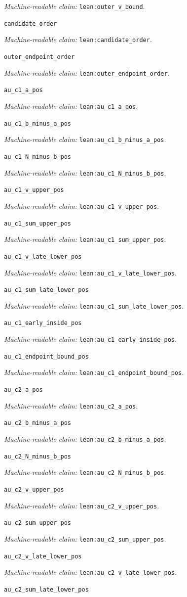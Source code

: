 \documentclass[11pt]{amsart}
\newcommand{\record}[1]{\nolinkurl{#1}}
\newcommand{\claimid}[1]{\par\nopagebreak\noindent\textit{Machine-readable claim:} \record{#1}.\par}
\begin{document}
\claimid{lean:outer_v_bound}
\par\noindent\label{lean:candidate_order}\record{candidate_order}
\claimid{lean:candidate_order}
\par\noindent\label{lean:outer_endpoint_order}\record{outer_endpoint_order}
\claimid{lean:outer_endpoint_order}
\par\noindent\label{lean:au_c1_a_pos}\record{au_c1_a_pos}
\claimid{lean:au_c1_a_pos}
\par\noindent\label{lean:au_c1_b_minus_a_pos}\record{au_c1_b_minus_a_pos}
\claimid{lean:au_c1_b_minus_a_pos}
\par\noindent\label{lean:au_c1_N_minus_b_pos}\record{au_c1_N_minus_b_pos}
\claimid{lean:au_c1_N_minus_b_pos}
\par\noindent\label{lean:au_c1_v_upper_pos}\record{au_c1_v_upper_pos}
\claimid{lean:au_c1_v_upper_pos}
\par\noindent\label{lean:au_c1_sum_upper_pos}\record{au_c1_sum_upper_pos}
\claimid{lean:au_c1_sum_upper_pos}
\par\noindent\label{lean:au_c1_v_late_lower_pos}\record{au_c1_v_late_lower_pos}
\claimid{lean:au_c1_v_late_lower_pos}
\par\noindent\label{lean:au_c1_sum_late_lower_pos}\record{au_c1_sum_late_lower_pos}
\claimid{lean:au_c1_sum_late_lower_pos}
\par\noindent\label{lean:au_c1_early_inside_pos}\record{au_c1_early_inside_pos}
\claimid{lean:au_c1_early_inside_pos}
\par\noindent\label{lean:au_c1_endpoint_bound_pos}\record{au_c1_endpoint_bound_pos}
\claimid{lean:au_c1_endpoint_bound_pos}
\par\noindent\label{lean:au_c2_a_pos}\record{au_c2_a_pos}
\claimid{lean:au_c2_a_pos}
\par\noindent\label{lean:au_c2_b_minus_a_pos}\record{au_c2_b_minus_a_pos}
\claimid{lean:au_c2_b_minus_a_pos}
\par\noindent\label{lean:au_c2_N_minus_b_pos}\record{au_c2_N_minus_b_pos}
\claimid{lean:au_c2_N_minus_b_pos}
\par\noindent\label{lean:au_c2_v_upper_pos}\record{au_c2_v_upper_pos}
\claimid{lean:au_c2_v_upper_pos}
\par\noindent\label{lean:au_c2_sum_upper_pos}\record{au_c2_sum_upper_pos}
\claimid{lean:au_c2_sum_upper_pos}
\par\noindent\label{lean:au_c2_v_late_lower_pos}\record{au_c2_v_late_lower_pos}
\claimid{lean:au_c2_v_late_lower_pos}
\par\noindent\label{lean:au_c2_sum_late_lower_pos}\record{au_c2_sum_late_lower_pos}
\end{document}

